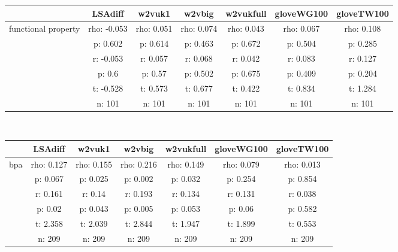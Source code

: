 \documentclass{article}
\begin{document}
\begin{tabular}{ccccccc|}\cline{2-7}
&\multicolumn{1}{|c}{LSAdiff} & w2vuk1 & w2vbig & w2vukfull & gloveWG100 & gloveTW100 \\\hline
\multicolumn{1}{|c|}{\multirow{6}{*}{functional property}} & rho: -0.053 & rho: 0.051 & rho: 0.074 & rho: 0.043 & rho: 0.067 & rho: 0.108 \\
\multicolumn{1}{|c|}{} & p: 0.602 & p: 0.614 & p: 0.463 & p: 0.672 & p: 0.504 & p: 0.285 \\
\multicolumn{1}{|c|}{} & r: -0.053 & r: 0.057 & r: 0.068 & r: 0.042 & r: 0.083 & r: 0.127 \\
\multicolumn{1}{|c|}{} & p: 0.6 & p: 0.57 & p: 0.502 & p: 0.675 & p: 0.409 & p: 0.204 \\
\multicolumn{1}{|c|}{} & t: -0.528 & t: 0.573 & t: 0.677 & t: 0.422 & t: 0.834 & t: 1.284 \\
\multicolumn{1}{|c|}{} & n: 101 & n: 101 & n: 101 & n: 101 & n: 101 & n: 101 \\
\hline
\end{tabular}\\
\begin{tabular}{ccccccc|}\cline{2-7}
&\multicolumn{1}{|c}{LSAdiff} & w2vuk1 & w2vbig & w2vukfull & gloveWG100 & gloveTW100 \\\hline
\multicolumn{1}{|c|}{\multirow{6}{*}{bpa}} & rho: 0.127 & rho: 0.155 & rho: 0.216 & rho: 0.149 & rho: 0.079 & rho: 0.013 \\
\multicolumn{1}{|c|}{} & p: 0.067 & p: 0.025 & p: 0.002 & p: 0.032 & p: 0.254 & p: 0.854 \\
\multicolumn{1}{|c|}{} & r: 0.161 & r: 0.14 & r: 0.193 & r: 0.134 & r: 0.131 & r: 0.038 \\
\multicolumn{1}{|c|}{} & p: 0.02 & p: 0.043 & p: 0.005 & p: 0.053 & p: 0.06 & p: 0.582 \\
\multicolumn{1}{|c|}{} & t: 2.358 & t: 2.039 & t: 2.844 & t: 1.947 & t: 1.899 & t: 0.553 \\
\multicolumn{1}{|c|}{} & n: 209 & n: 209 & n: 209 & n: 209 & n: 209 & n: 209 \\
\hline
\end{tabular}\\
\end{document}
